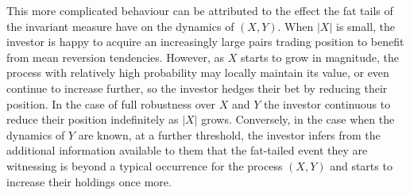 \documentclass{article}
\theoremstyle{plain}
\theoremstyle{definition}
\renewcommand{\P}{\mathbb{P}}
\numberwithin{lem}{section}
\begin{document}
This more complicated behaviour can be attributed to the effect the fat tails of the invariant measure have on the dynamics of $(X,Y)$. When $|X|$ is small, the investor is happy to acquire an increasingly large pairs trading position to benefit from mean reversion tendencies. However, as $X$ starts to grow in magnitude, the process with relatively high probability may locally maintain its value, or even continue to increase further, so the investor hedges their bet by reducing their position. In the case of full robustness over $X$ and $Y$ the investor continuous to reduce their position indefinitely as $|X|$ grows. Conversely, in the case when the dynamics of $Y$ are known, at a further threshold, the investor infers from the additional information available to them that the fat-tailed event they are witnessing is beyond a typical occurrence for the process $(X,Y)$ and starts to increase their holdings once more.
\end{document}
